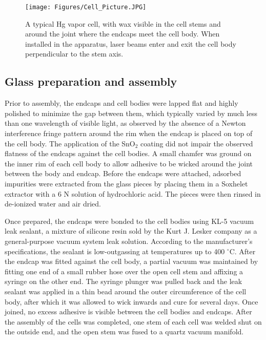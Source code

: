 \documentclass [10pt, twoside] {uwthesis}[2012/04/02]
\begin{document}
\begin{figure}
\begin{center}
\texttt{[image: Figures/Cell\_Picture.JPG]}
\end{center}
\caption[A typical Hg vapor cell]%
{\narrower A typical Hg vapor cell, with wax visible in the cell stems and around the joint where the endcaps meet the cell body. When installed in the apparatus, laser beams enter and exit the cell body perpendicular to the stem axis.}
\label{HgCell}
\end{figure} 

\subsection{Glass preparation and assembly}
Prior to assembly, the endcaps and cell bodies were lapped flat and highly polished to minimize the gap between them, which typically varied by much less than one wavelength of visible light, as observed by the absence of a Newton interference fringe pattern around the rim when the endcap is placed on top of the cell body. The application of the SnO$_2$ coating did not impair the observed flatness of the endcaps against the cell bodies. A small chamfer was ground on the inner rim of each cell body to allow adhesive to be wicked around the joint between the body and endcap.  Before the endcaps were attached, adsorbed impurities were extracted from the glass pieces by placing them in a Soxhelet extractor with a 6 N solution of hydrochloric acid. The pieces were then rinsed in de-ionized water and air dried.

Once prepared, the endcaps were bonded to the cell bodies using KL-5 vacuum leak sealant, a mixture of silicone resin sold by the Kurt J. Lesker company as a general-purpose vacuum system leak solution. According to the manufacturer's specifications, the sealant is low-outgassing at temperatures up to 400 $^{\circ}$C. After the endcap was fitted against the cell body, a partial vacuum was maintained by fitting one end of a small rubber hose over the open cell stem and affixing a syringe on the other end. The syringe plunger was pulled back and the leak sealant was applied in a thin bead around the outer circumference of the cell body, after which it was allowed to wick inwards and cure for several days. Once joined, no excess adhesive is visible between the cell bodies and endcaps. After the assembly of the cells was completed, one stem of each cell was welded shut on the outside end, and the open stem was fused to a quartz vacuum manifold. 
\end{document}
